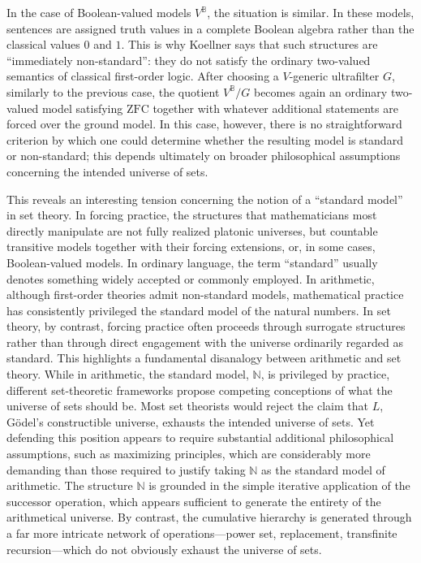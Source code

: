 \documentclass[11pt,a4paper]{article}
\theoremstyle{plain}
\begin{document}
In the case of Boolean-valued models \(V^{\mathbb{B}}\), the situation is similar. In these models, sentences are assigned truth values in a complete Boolean algebra rather than the classical values \(0\) and \(1\). This is why Koellner says that such structures are ``immediately non-standard'': they do not satisfy the ordinary two-valued semantics of classical first-order logic. After choosing a \(V\)-generic ultrafilter \(G\), similarly to the previous case, the quotient \(V^{\mathbb{B}}/G\) becomes again an ordinary two-valued model satisfying \(\mathrm{ZFC}\) together with whatever additional statements are forced over the ground model. In this case, however, there is no straightforward criterion by which one could determine whether the resulting model is standard or non-standard; this depends ultimately on broader philosophical assumptions concerning the intended universe of sets.

This reveals an interesting tension concerning the notion of a ``standard model'' in set theory. In forcing practice, the structures that mathematicians most directly manipulate are not fully realized platonic universes, but countable transitive models together with their forcing extensions, or, in some cases, Boolean-valued models. In ordinary language, the term ``standard'' usually denotes something widely accepted or commonly employed. In arithmetic, although first-order theories admit non-standard models, mathematical practice has consistently privileged the standard model of the natural numbers. In set theory, by contrast, forcing practice often proceeds through surrogate structures rather than through direct engagement with the universe ordinarily regarded as standard.
This highlights a fundamental disanalogy between arithmetic and set theory. While in arithmetic, the standard model, \(\mathbb{N}\), is privileged by practice, different set-theoretic frameworks propose competing conceptions of what the universe of sets should be. Most set theorists would reject the claim that \(L\), Gödel's constructible universe, exhausts the intended universe of sets. Yet defending this position appears to require substantial additional philosophical assumptions, such as maximizing principles, which are considerably more demanding than those required to justify taking \(\mathbb{N}\) as the standard model of arithmetic. The structure \(\mathbb{N}\) is grounded in the simple iterative application of the successor operation, which appears sufficient to generate the entirety of the arithmetical universe. By contrast, the cumulative hierarchy is generated through a far more intricate network of operations---power set, replacement, transfinite recursion---which do not obviously exhaust the universe of sets.
\end{document}
